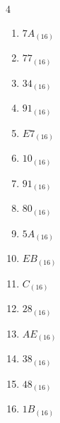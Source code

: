\begin{multicols}{4}
\begin{enumerate}
  \item $7A_{(16)}$

        \phantom{$=122$}

  \item $77_{(16)}$

        \phantom{$=119$}

  \item $34_{(16)}$

        \phantom{$=52$}

  \item $91_{(16)}$

        \phantom{$=145$}

  \item $E7_{(16)}$

        \phantom{$=231$}

  \item $10_{(16)}$

        \phantom{$=16$}

  \item $91_{(16)}$

        \phantom{$=145$}

  \item $80_{(16)}$

        \phantom{$=128$}

  \item $5A_{(16)}$

        \phantom{$=90$}

  \item $EB_{(16)}$

        \phantom{$=235$}

\columnbreak %

  \item $C_{(16)}$

        \phantom{$=12$}

  \item $28_{(16)}$

        \phantom{$=40$}

  \item $AE_{(16)}$

        \phantom{$=174$}

  \item $38_{(16)}$

        \phantom{$=56$}

  \item $48_{(16)}$

        \phantom{$=72$}

  \item $1B_{(16)}$


\end{enumerate}
\end{multicols}
